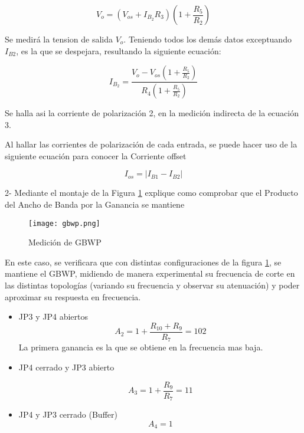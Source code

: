 \begin{equation}
    V_o = \left( V_{os} + I_{B_2} R_3 \right) \left( 1 + \frac{R_5}{R_2} \right)
\end{equation}

Se medirá la tension de salida $V_o$. Teniendo todos los demás datos exceptuando $I_{B2}$, es la que se despejara, resultando la siguiente ecuación:

\begin{equation}
    I_{B_2} = \frac{V_o - V_{os} \left( 1 + \frac{R_5}{R_2} \right)}{R_4 \left( 1 + \frac{R_5}{R_2} \right)}
\end{equation}

Se halla asi la corriente de polarización 2, en la medición indirecta de la ecuación 3.

Al hallar las corrientes de polarización de cada entrada, se puede hacer uso de la siguiente ecuación para conocer la Corriente offset

\begin{equation}
    I_{os} = \left| I_{B1} - I_{B2} \right|
\end{equation}

2- Mediante el montaje de la Figura \ref{fig:gbwp} explique como comprobar que el Producto del Ancho de Banda por la Ganancia
se mantiene

\begin{figure}[ht]
    \centering
    \texttt{[image: gbwp.png]}
    \caption{Medición de GBWP}
    \label{fig:gbwp}
\end{figure}

En este caso, se verificara que con distintas configuraciones de la figura \ref{fig:gbwp}, se mantiene el GBWP, midiendo de manera experimental su frecuencia de corte en las distintas topologías
(variando su frecuencia y observar su atenuación) y poder aproximar su respuesta en frecuencia.

\begin{itemize}
    \item JP3 y JP4 abiertos
    $$A_2 = 1 + \frac{R_{10} + R_9}{R_7} = 102$$
    La primera ganancia es la que se obtiene en la frecuencia mas baja.
    \item JP4 cerrado y JP3 abierto

    $$A_3 = 1 + \frac{R_9}{R_7} = 11$$

    \item JP4 y JP3 cerrado (Buffer)
    $$A_4=1$$

\end{itemize}

